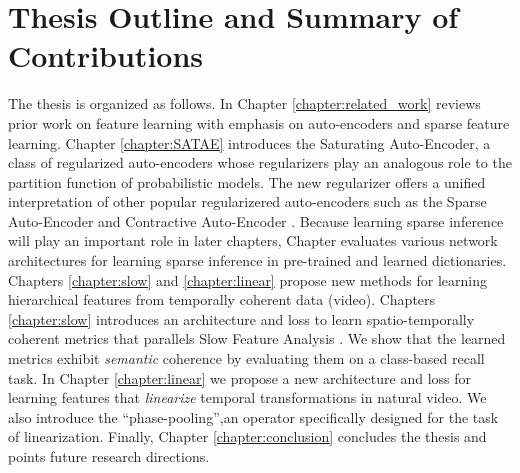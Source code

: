 \section{Thesis Outline and Summary of Contributions} 

The thesis is organized as follows. In Chapter \ref{chapter:related_work}
reviews prior work on feature learning with emphasis on auto-encoders and
sparse feature learning.  Chapter \ref{chapter:SATAE} introduces the Saturating
Auto-Encoder, a class of regularized auto-encoders whose regularizers play an
analogous role to the partition function of probabilistic models. The new
regularizer offers a unified interpretation of other popular
regularizered auto-encoders such as the Sparse Auto-Encoder and Contractive
Auto-Encoder \cite{SAE,CAE}. Because learning sparse inference will play an
important role in later chapters, Chapter \cite{LISTA} evaluates various
network architectures for learning sparse inference in pre-trained and learned
dictionaries. Chapters \ref{chapter:slow} and \ref{chapter:linear} propose 
new methods for learning hierarchical features from temporally coherent data (video).        
Chapters \ref{chapter:slow} introduces an architecture and loss to learn spatio-temporally
coherent metrics that parallels Slow Feature Analysis \cite{SFA}. We show that 
the learned metrics exhibit \emph{semantic} coherence by evaluating them on a class-based recall 
task. In Chapter \ref{chapter:linear} we propose a new architecture and loss for learning 
features that \emph{linearize} temporal transformations in natural video. We also 
introduce the ``phase-pooling'',an operator specifically designed for the task of linearization. 
Finally, Chapter \ref{chapter:conclusion} concludes the thesis and points future research 
directions. 






